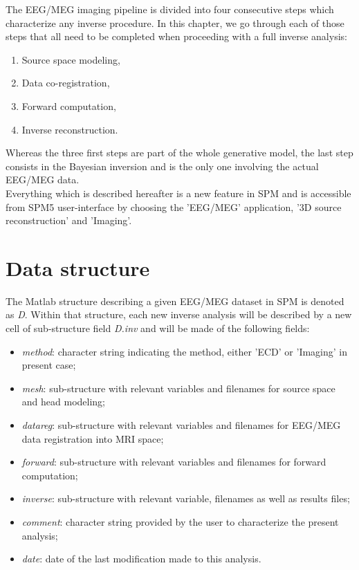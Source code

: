 The EEG/MEG imaging pipeline is divided into four consecutive steps which characterize any inverse procedure. In this chapter, we go through each of those steps that all need to be completed when proceeding with a full inverse analysis:
\begin{enumerate}
	\item Source space modeling,
	\item Data co-registration,
	\item Forward computation,
	\item Inverse reconstruction.
\end{enumerate}

Whereas the three first steps are part of the whole generative model, the last step consists in the Bayesian inversion and is the only one involving the actual EEG/MEG data.\\

Everything which is described hereafter is a new feature in SPM and is accessible from SPM5 user-interface by choosing the 'EEG/MEG' application, '3D source reconstruction' and 'Imaging'.

\section{Data structure}
\label{sec:datastruct}
The Matlab structure describing a given EEG/MEG dataset in SPM is denoted as \textit{D}. Within that structure, each new inverse analysis will be described by a new cell of sub-structure field \textit{D.inv} and will be made of the following fields:

\begin{itemize}
	\item \textit{method}: character string indicating the method, either 'ECD' or 'Imaging' in present case;
	\item \textit{mesh}: sub-structure with relevant variables and filenames for source space and head modeling;
	\item \textit{datareg}: sub-structure with relevant variables and filenames for EEG/MEG data registration into MRI space;
	\item \textit{forward}: sub-structure with relevant variables and filenames for forward computation;
	\item \textit{inverse}: sub-structure with relevant variable, filenames as well as results files;
	\item \textit{comment}: character string provided by the user to characterize the present analysis;
	\item \textit{date}: date of the last modification made to this analysis.
\end{itemize}


